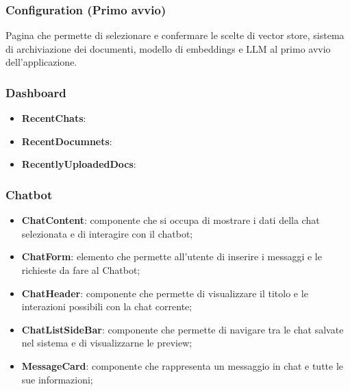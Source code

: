 \documentclass[10pt, a4paper]{article}
\begin{document}
\subsubsection{Configuration (Primo avvio)}
Pagina che permette di selezionare e confermare le scelte di vector store, sistema di archiviazione dei documenti, modello di embeddings e LLM al primo avvio dell'applicazione.

\subsubsection{Dashboard}
\begin{itemize}
    \item \label{RecentChats}\textbf{RecentChats}:
    \item \label{RecentDocuments}\textbf{RecentDocumnets}:
    \item \label{RecentlyUploadedDocs}\textbf{RecentlyUploadedDocs}:
   
\end{itemize}





\subsubsection{Chatbot}
\begin{itemize} 
    \item \label{ChatContent}\textbf{ChatContent}: componente che si occupa di mostrare i dati della chat selezionata e di interagire con il chatbot;
    \item \label{ChatForm}\textbf{ChatForm}: elemento che permette all'utente di inserire i messaggi e le richieste da fare al Chatbot;
    \item \label{ChatHeader}\textbf{ChatHeader}: componente che permette di visualizzare il titolo e le interazioni possibili con la chat corrente; 
    \item \label{ChatListSideBar}\textbf{ChatListSideBar}: componente che permette di navigare tra le chat salvate nel sistema e di visualizzarne le preview;
    \item \label{MessageCard}\textbf{MessageCard}: componente che rappresenta un messaggio in chat e tutte le sue informazioni;    
\end{itemize}
\end{document}
